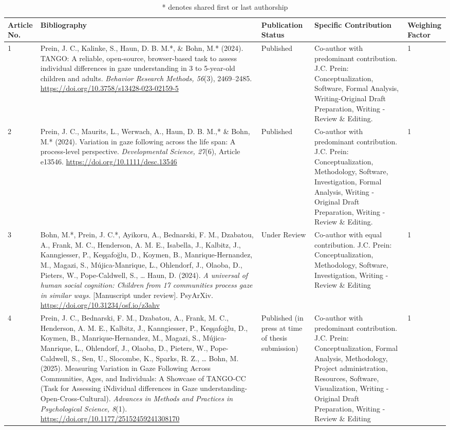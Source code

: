 \documentclass[
]{scrbook}
\begin{document}
\begin{table}[H]
\centering
\footnotesize
\begin{tabular}{p{8mm}p{55mm}p{18mm}p{48mm}p{9mm}}\toprule
Article No. & Bibliography & Publication Status & Specific Contribution & Weighing Factor \\
\midrule
1 & Prein, J. C., Kalinke, S., Haun, D. B. M.*, \& Bohn, M.* (2024). TANGO: A reliable, open-source, browser-based task to assess individual differences in gaze understanding in 3 to 5-year-old children and adults. \textit{Behavior Research Methods, 56}(3), 2469–2485. \url{https://doi.org/10.3758/s13428-023-02159-5} & Published & Co-author with predominant contribution. J.C. Prein: Conceptualization, Software, Formal Analysis, Writing-Original Draft Preparation, Writing - Review \& Editing. & 1 \\
2 & Prein, J. C., Maurits, L., Werwach, A., Haun, D. B. M.,* \& Bohn, M.* (2024). Variation in gaze following across the life span: A process-level perspective. \textit{Developmental Science, 27}(6), Article e13546. \url{https://doi.org/10.1111/desc.13546} & Published & Co-author with predominant contribution. J.C. Prein: Conceptualization, Methodology, Software, Investigation, Formal Analysis, Writing - Original Draft Preparation, Writing - Review \& Editing.  & 1 \\
3 & Bohn, M.*, Prein, J. C.*, Ayikoru, A., Bednarski, F. M., Dzabatou, A., Frank, M. C., Henderson, A. M. E., Isabella, J., Kalbitz, J., Kanngiesser, P., Keşşafoğlu, D., Koymen, B., Manrique-Hernandez, M., Magazi, S., Mújica-Manrique, L., Ohlendorf, J., Olaoba, D., Pieters, W., Pope-Caldwell, S., … Haun, D. (2024). \textit{A universal of human social cognition: Children from 17 communities process gaze in similar ways.} [Manuscript under review]. PsyArXiv. \url{https://doi.org/10.31234/osf.io/z3ahv} & Under Review & Co-author with equal contribution. J.C. Prein: Conceptualization, Methodology, Software, Investigation, Writing - Review \& Editing & 1 \\
4 & Prein, J. C., Bednarski, F. M., Dzabatou, A., Frank, M. C., Henderson, A. M. E., Kalbitz, J., Kanngiesser, P., Keşşafoğlu, D., Koymen, B., Manrique-Hernandez, M., Magazi, S., Mújica-Manrique, L., Ohlendorf, J., Olaoba, D., Pieters, W., Pope-Caldwell, S., Sen, U., Slocombe, K., Sparks, R. Z., … Bohn, M. (2025). Measuring Variation in Gaze Following Across Communities, Ages, and Individuals: A Showcase of TANGO-CC (Task for Assessing iNdividual differences in Gaze understanding-Open-Cross-Cultural). \textit{Advances in Methods and Practices in Psychological Science, 8}(1). \url{https://doi.org/10.1177/25152459241308170} & Published (in press at time of thesis submission) & Co-author with predominant contribution. J.C. Prein: Conceptualization, Formal Analysis, Methodology, Project administration, Resources, Software, Visualization, Writing - Original Draft Preparation, Writing - Review \& Editing & 1 \\
\bottomrule
\end{tabular}
\caption{\scriptsize{* denotes shared first or last authorship}}
\end{table}
\end{document}
